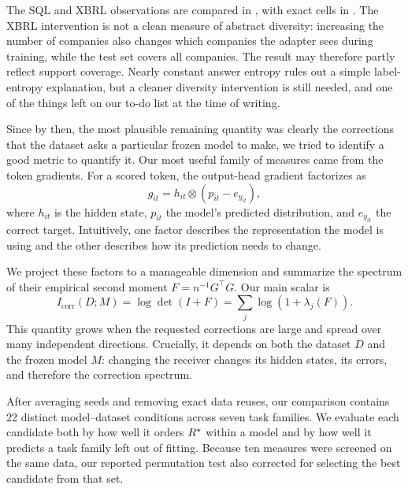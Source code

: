The SQL and XBRL observations are compared in , with exact cells in . The XBRL intervention is not a clean measure of abstract diversity: increasing the number of companies also changes which companies the adapter sees during training, while the test set covers all companies. The result may therefore partly reflect support coverage. Nearly constant answer entropy rules out a simple label-entropy explanation, but a cleaner diversity intervention is still needed, and one of the things left on our to-do list at the time of writing.

Since by then, the most plausible remaining quantity was clearly the corrections that the dataset asks a particular frozen model to make, we tried to identify a good metric to quantify it. Our most useful family of measures came from the token gradients. For a scored token, the output-head gradient factorizes as
\[
g_{it}=h_{it}\otimes\left(p_{it}-e_{y_{it}}\right),
\]
where $h_{it}$ is the hidden state, $p_{it}$ the model's predicted distribution, and $e_{y_{it}}$ the correct target. Intuitively, one factor describes the representation the model is using and the other describes how its prediction needs to change.

We project these factors to a manageable dimension and summarize the spectrum of their empirical second moment $F=n^{-1}G^\top G$. Our main scalar is
\[
I_{\mathrm{corr}}(D;M)=\log\det(I+F)=\sum_j\log(1+\lambda_j(F)).
\]
This quantity grows when the requested corrections are large and spread over many independent directions. Crucially, it depends on both the dataset $D$ and the frozen model $M$: changing the receiver changes its hidden states, its errors, and therefore the correction spectrum.

After averaging seeds and removing exact data reuses, our comparison contains 22 distinct model--dataset conditions across seven task families. We evaluate each candidate both by how well it orders $R^{\star}$ within a model and by how well it predicts a task family left out of fitting. Because ten measures were screened on the same data, our reported permutation test also corrected for selecting the best candidate from that set.


